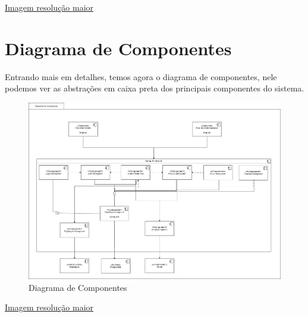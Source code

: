   \href{https://github.com/soltein/TCC/blob/main/Diagramas/out/diagrama_container/diagrama_container.png}{Imagem resolução maior}

  \section{Diagrama de Componentes}
  Entrando mais em detalhes, temos agora o diagrama de componentes, nele podemos ver as abstrações em caixa preta dos principais componentes
  do sistema.
  
  \begin{figure}[h]
    \centering
    \includegraphics[width=1\textwidth]{diagrama_componentes.png}
    \caption{Diagrama de Componentes}
    \label{fig:Diagrama de Componentes}
  \end{figure}

  \href{https://github.com/soltein/TCC/blob/main/Diagramas/out/diagrama_componentes.png}{Imagem resolução maior}
